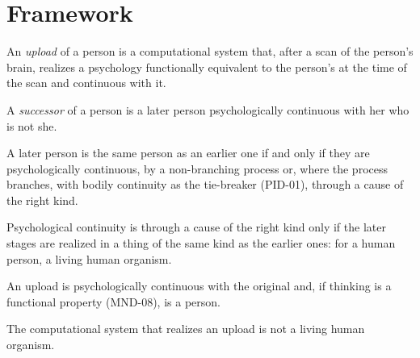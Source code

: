 \documentclass{situationist-preprint}
\begin{document}
\section{Framework}\label{s:frame}

\begin{definition}\label{d:upload}
An \emph{upload} of a person is a computational system that, after a scan of the person's brain, realizes a psychology functionally equivalent to the person's at the time of the scan and continuous with it.
\end{definition}

\begin{definition}\label{d:succ}
A \emph{successor} of a person is a later person psychologically continuous with her who is not she.
\end{definition}

\begin{principle}\label{p:pc}
A later person is the same person as an earlier one if and only if they are psychologically continuous, by a non-branching process or, where the process branches, with bodily continuity as the tie-breaker (PID-01), through a cause of the right kind.
\end{principle}

\begin{principle}\label{p:kind}
Psychological continuity is through a cause of the right kind only if the later stages are realized in a thing of the same kind as the earlier ones: for a human person, a living human organism.
\end{principle}

\begin{assumption}\label{a:func}
An upload is psychologically continuous with the original and, if thinking is a functional property (MND-08), is a person.
\end{assumption}

\begin{assumption}\label{a:notorg}
The computational system that realizes an upload is not a living human organism.
\end{assumption}
\end{document}

